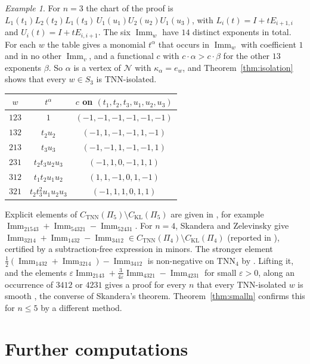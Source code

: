 \documentclass[11pt]{amsart}
\theoremstyle{definition}
\theoremstyle{remark}
\newtheorem{exa}{Example}[section]
\newcommand{\Imm}{\operatorname{Imm}}
\newcommand{\TNN}{\mathrm{TNN}}
\newcommand{\CKL}{C_{\mathrm{KL}}}
\newcommand{\CTNN}{C_{\mathrm{TNN}}}
\begin{document}
\begin{exa}\label{exa:isolation}
For $n=3$ the chart of the proof is $L_1(t_1)L_2(t_2)L_1(t_3)\,U_1(u_1)U_2(u_2)U_1(u_3)$, with $L_i(t)=I+tE_{i+1,i}$ and $U_i(t)=I+tE_{i,i+1}$. The six $\Imm_w$ have $14$ distinct exponents in total. For each $w$ the table gives a monomial $t^\alpha$ that occurs in $\Imm_w$ with coefficient $1$ and in no other $\Imm_v$, and a functional $c$ with $c\cdot\alpha>c\cdot\beta$ for the other $13$ exponents $\beta$. So $\alpha$ is a vertex of $\mathcal N$ with $\kappa_\alpha=e_w$, and Theorem~\ref{thm:isolation} shows that every $w\in S_3$ is TNN-isolated.
\begin{center}
\small
\begin{tabular}{ccc}
\toprule
$w$ & $t^\alpha$ & $c$ on $(t_1,t_2,t_3,u_1,u_2,u_3)$\\
\midrule
$123$ & $1$ & $(-1,-1,-1,-1,-1,-1)$\\
$132$ & $t_2u_2$ & $(-1,1,-1,-1,1,-1)$\\
$213$ & $t_3u_3$ & $(-1,-1,1,-1,-1,1)$\\
$231$ & $t_2t_3u_2u_3$ & $(-1,1,0,-1,1,1)$\\
$312$ & $t_1t_2u_1u_2$ & $(1,1,-1,0,1,-1)$\\
$321$ & $t_2t_3^2u_1u_2u_3$ & $(-1,1,1,0,1,1)$\\
\bottomrule
\end{tabular}
\end{center}
\end{exa}

Explicit elements of $\CTNN(\Pi_5)\setminus\CKL(\Pi_5)$ are given in \cite[Thm.~9.2]{McN}, for example $\Imm_{21543}+\Imm_{54321}-\Imm_{52431}$. For $n=4$, Skandera and Zelevinsky give $\Imm_{3214}+\Imm_{1432}-\Imm_{3412}\in\CTNN(\Pi_4)\setminus\CKL(\Pi_4)$ (reported in \cite[(5.1)]{Ska08}), certified by a subtraction-free expression in minors. The stronger element $\tfrac12(\Imm_{1432}+\Imm_{3214})-\Imm_{3412}$ is non-negative on $\TNN_4$ by \cite[Prop.~9.3]{McN}. Lifting it, and the elements $\varepsilon\Imm_{2143}+\tfrac3{4\varepsilon}\Imm_{4321}-\Imm_{4231}$ for small $\varepsilon>0$, along an occurrence of $3412$ or $4231$ gives a proof for every $n$ that every TNN-isolated $w$ is smooth \cite[Thm.~9.6]{McN}, the converse of Skandera's theorem. Theorem~\ref{thm:smalln} confirms this for $n\le5$ by a different method.

\section{Further computations}\label{sec:evidence}
\end{document}
